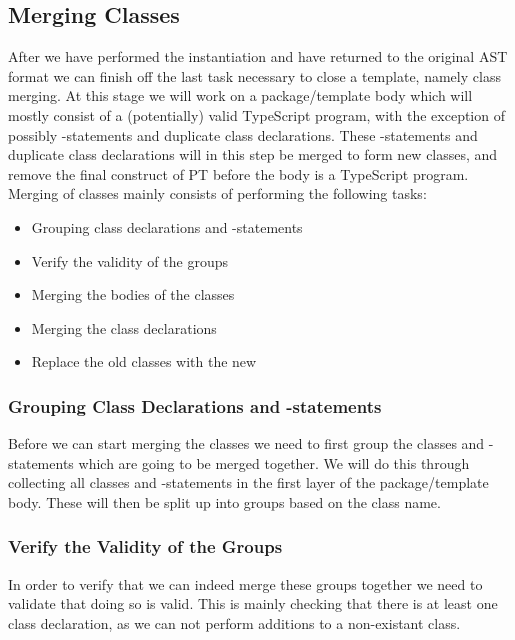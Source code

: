 \subsection{Merging Classes}\label{subsec:merging-class-declarations}

After we have performed the instantiation and have returned to the original AST format we can finish off the last task necessary to close a template, namely class merging.
At this stage we will work on a package/template body which will mostly consist of a (potentially) valid TypeScript program, with the exception of possibly -statements and duplicate class declarations.
These -statements and duplicate class declarations will in this step be merged to form new classes, and remove the final construct of PT before the body is a TypeScript program.
Merging of classes mainly consists of performing the following tasks:

\begin{itemize}
    \item Grouping class declarations and -statements
    \item Verify the validity of the groups
    \item Merging the bodies of the classes
    \item Merging the class declarations
    \item Replace the old classes with the new
\end{itemize}

\subsubsection{Grouping Class Declarations and -statements}

Before we can start merging the classes we need to first group the classes and -statements which are going to be merged together.
We will do this through collecting all classes and -statements in the first layer of the package/template body.
These will then be split up into groups based on the class name.

\subsubsection{Verify the Validity of the Groups}

In order to verify that we can indeed merge these groups together we need to validate that doing so is valid.
This is mainly checking that there is at least one class declaration, as we can not perform additions to a non-existant class.

